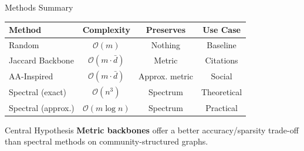 \documentclass[aspectratio=169]{beamer}
\begin{document}
\begin{frame}[shrink=3]{\faList \quad Methods Summary}
    \begin{center}
    \begin{tabular}{lccc}
        \toprule
        \textbf{\textcolor{lighttext}{Method}} & \textbf{\textcolor{lighttext}{Complexity}} & \textbf{\textcolor{lighttext}{Preserves}} & \textbf{\textcolor{lighttext}{Use Case}} \\
        \midrule
        Random & $\mathcal{O}(m)$ & Nothing & Baseline \\
        \textcolor{cyanneon}{Jaccard Backbone} & $\mathcal{O}(m \cdot \bar{d})$ & Metric & Citations \\
        \textcolor{cyanneon}{AA-Inspired} & $\mathcal{O}(m \cdot \bar{d})$ & Approx. metric & Social \\
        Spectral (exact) & $\mathcal{O}(n^3)$ & Spectrum & Theoretical \\
        Spectral (approx.) & $\mathcal{O}(m \log n)$ & Spectrum & Practical \\
        \bottomrule
    \end{tabular}
    \end{center}
    
    \vspace{0.2cm}
    \begin{exampleblock}{\faLightbulb \quad Central Hypothesis}
        \textbf{Metric backbones} offer a better accuracy/sparsity trade-off than spectral methods on community-structured graphs.
    \end{exampleblock}
\end{frame}
\end{document}
